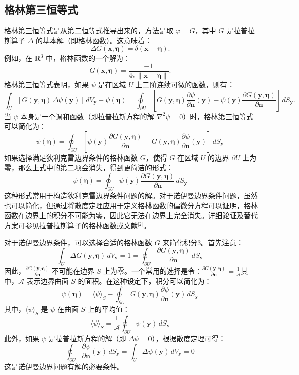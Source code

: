 \subsection{格林第三恒等式}
格林第三恒等式是从第二恒等式推导出来的，方法是取 $\varphi = G$，其中 $G$ 是拉普拉斯算子 $\Delta$ 的基本解（即格林函数）。这意味着：
$$
\Delta G(\mathbf{x}, \boldsymbol{\eta}) = \delta(\mathbf{x} - \boldsymbol{\eta}).~
$$
例如，在 $\mathbf{R}^3$ 中，格林函数的一个解为：
$$
G(\mathbf{x}, \boldsymbol{\eta}) = \frac{-1}{4\pi \|\mathbf{x} - \boldsymbol{\eta}\|}.~
$$
格林第三恒等式表明，如果 $\psi$ 是在区域 $U$ 上二阶连续可微的函数，则有：
$$
\int_{U} \left[ G(\mathbf{y}, \boldsymbol{\eta}) \, \Delta \psi(\mathbf{y}) \right] \, dV_{\mathbf{y}}
- \psi(\boldsymbol{\eta})
=
\oint_{\partial U} 
\left[
G(\mathbf{y}, \boldsymbol{\eta}) 
\frac{\partial \psi}{\partial \mathbf{n}} (\mathbf{y})
-
\psi(\mathbf{y})
\frac{\partial G(\mathbf{y}, \boldsymbol{\eta})}{\partial \mathbf{n}}
\right] 
\, dS_{\mathbf{y}}.~
$$
当 $\psi$ 本身是一个调和函数（即拉普拉斯方程的解 $\nabla^2 \psi = 0$）时，格林第三恒等式可以简化为：
$$
\psi(\boldsymbol{\eta}) 
= 
\oint_{\partial U} 
\left[
\psi(\mathbf{y}) 
\frac{\partial G(\mathbf{y}, \boldsymbol{\eta})}{\partial \mathbf{n}}
-
G(\mathbf{y}, \boldsymbol{\eta}) 
\frac{\partial \psi}{\partial \mathbf{n}}(\mathbf{y})
\right] 
\, dS_{\mathbf{y}}~
$$
如果选择满足狄利克雷边界条件的格林函数 $G$，使得 $G$ 在区域 $U$ 的边界 $\partial U$ 上为零，那么上式中的第二项会消失，得到更简洁的形式：
$$
\psi(\boldsymbol{\eta}) 
= 
\oint_{\partial U} 
\psi(\mathbf{y}) 
\frac{\partial G(\mathbf{y}, \boldsymbol{\eta})}{\partial \mathbf{n}}
\, dS_{\mathbf{y}}~
$$
这种形式常用于构造狄利克雷边界条件问题的解。对于诺伊曼边界条件问题，虽然也可以简化，但通过将散度定理应用于定义格林函数的偏微分方程可以证明，格林函数在边界上的积分不可能为零，因此它无法在边界上完全消失。详细论证及替代方案可参见拉普拉斯算子的格林函数或文献\(^\text{[2]}\)。

对于诺伊曼边界条件，可以选择合适的格林函数 $G$ 来简化积分$3$。首先注意：
$$
\int_U 
\Delta G(\mathbf{y}, \boldsymbol{\eta}) 
\, dV_{\mathbf{y}}
= 1
= 
\oint_{\partial U} 
\frac{\partial G(\mathbf{y}, \boldsymbol{\eta})}{\partial \mathbf{n}}
\, dS_{\mathbf{y}}~
$$
因此，$\displaystyle \frac{\partial G(\mathbf{y}, \boldsymbol{\eta})}{\partial \mathbf{n}}$ 不可能在边界 $S$ 上为零。一个常用的选择是令：$\frac{\partial G(\mathbf{y}, \boldsymbol{\eta})}{\partial \mathbf{n}}= \frac{1}{\mathcal{A}}$其中，$\mathcal{A}$ 表示边界曲面 $S$ 的面积。在这种设定下，积分可以简化为：
$$
\psi(\boldsymbol{\eta})
= 
\langle \psi \rangle_S
-
\oint_{\partial U}
G(\mathbf{y}, \boldsymbol{\eta})
\frac{\partial \psi}{\partial \mathbf{n}}(\mathbf{y})
\, dS_{\mathbf{y}}~
$$
其中，$\langle \psi \rangle_S$ 是 $\psi$ 在曲面 $S$ 上的平均值：
$$
\langle \psi \rangle_S
=
\frac{1}{\mathcal{A}}
\oint_{\partial U}
\psi(\mathbf{y})
\, dS_{\mathbf{y}}~
$$
此外，如果 $\psi$ 是拉普拉斯方程的解（即 $\Delta \psi = 0$），根据散度定理可得：
$$
\oint_{\partial U}
\frac{\partial \psi}{\partial \mathbf{n}}(\mathbf{y})
\, dS_{\mathbf{y}}
=
\int_U
\Delta \psi(\mathbf{y})
\, dV_{\mathbf{y}}
= 0~
$$
这是诺伊曼边界问题有解的必要条件。

